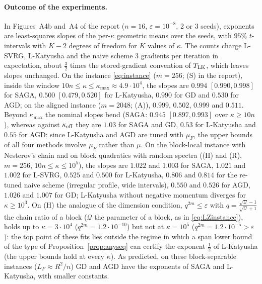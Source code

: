\paragraph{Outcome of the experiments.}
In Figures~A4b and~A4 of the report ($n=16$, $\varepsilon=10^{-8}$, 2 or 3 seeds), exponents are least-squares slopes of the per-$\kappa$ geometric means over the seeds, with $95\%$ $t$-intervals with $K-2$ degrees of freedom for $K$ values of $\kappa$. The counts charge L-SVRG, L-Katyusha and the naive scheme $3$ gradients per iteration in expectation, about $\frac32$ times the stored-gradient convention of $T_{\rm LK}$, which leaves slopes unchanged. On the instance \eqref{eq:instance} ($m=256$; (S) in the report), inside the window $10n\le\kappa\le\kappa_{\max}\approx4.9\cdot10^4$, the slopes are $0.994$ $[0.990,0.998]$ for SAGA, $0.500$ $[0.479,0.520]$ for L-Katyusha, $0.990$ for GD and $0.530$ for AGD; on the aligned instance ($m=2048$; (A)), $0.999$, $0.502$, $0.999$ and $0.511$. Beyond $\kappa_{\max}$ the nominal slopes bend (SAGA: $0.945$ $[0.897,0.993]$ over $\kappa\ge10n$), whereas against $\kappa_{\rm eff}$ they are $1.03$ for SAGA and GD, $0.53$ for L-Katyusha and $0.55$ for AGD: since L-Katyusha and AGD are tuned with $\mu_F$, the upper bounds of all four methods involve $\mu_F$ rather than $\mu$. On the block-local instance with Nesterov's chain and on block quadratics with random spectra ((H) and (R), $m=256$, $10n\le\kappa\le10^5$), the slopes are $1.022$ and $1.003$ for SAGA, $1.021$ and $1.002$ for L-SVRG, $0.525$ and $0.500$ for L-Katyusha, $0.806$ and $0.814$ for the re-tuned naive scheme (irregular profile, wide intervals), $0.550$ and $0.526$ for AGD, $1.026$ and $1.007$ for GD; L-Katyusha without negative momentum diverges for $\kappa\ge10^3$. On (H) the analogue of the dimension condition, $q^{2m}\le\varepsilon$ with $q=\frac{\sqrt{\mathcal Q}-1}{\sqrt{\mathcal Q}+1}$ the chain ratio of a block ($\mathcal Q$ the parameter of a block, as in \eqref{eq:LZinstance}), holds up to $\kappa=3\cdot10^4$ ($q^{2m}=1.2\cdot10^{-10}$) but not at $\kappa=10^5$ ($q^{2m}=1.2\cdot10^{-5}>\varepsilon$): the top point of these fits lies outside the regime in which a span lower bound of the type of Proposition~\ref{prop:anyseq} can certify the exponent $\frac12$ of L-Katyusha (the upper bounds hold at every $\kappa$). As predicted, on these block-separable instances ($L_F\approx R^2/n$) GD and AGD have the exponents of SAGA and L-Katyusha, with smaller constants.
